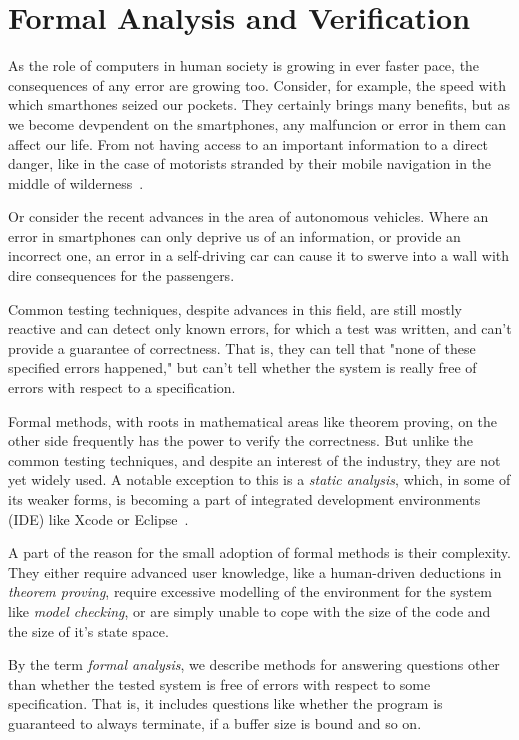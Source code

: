 
\chapter{Formal Analysis and Verification} \label{chap:fav}
As the role of computers in human society is growing in ever faster pace, the consequences of any error are growing too. Consider, for example, the speed with which smarthones seized our pockets. They certainly brings many benefits, but as we become devpendent on the smartphones, any malfuncion or error in them can affect our life. From not having access to an important information to a direct danger, like in the case of motorists stranded by their mobile navigation in the middle of wilderness~\cite{appleMaps}.

Or consider the recent advances in the area of autonomous vehicles. Where an error in smartphones can only deprive us of an information, or provide an incorrect one, an error in a self-driving car can cause it to swerve into a wall with dire consequences for the passengers.

Common testing techniques, despite advances in this field, are still mostly reactive and can detect only known errors, for which a test was written, and can't provide a guarantee of correctness. That is, they can tell that "none of these specified errors happened," but can't tell whether the system is really free of errors with respect to a specification.

Formal methods, with roots in mathematical areas like theorem proving, on the other side frequently has the power to verify the correctness. But unlike the common testing techniques, and despite an interest of the industry, they are not yet widely used. A notable exception to this is a {\em static analysis}, which, in some of its weaker forms, is becoming a part of integrated development environments (IDE) like Xcode or Eclipse~\cite{xcodeAnalysis}.

A part of the reason for the small adoption of formal methods is their complexity. They either require advanced user knowledge, like a human-driven deductions in {\em theorem proving}, require excessive modelling of the environment for the system like {\em model checking}, or are simply unable to cope with the size of the code and the size of it's state space.

By the term {\em formal analysis}, we describe methods for answering questions other than whether the tested system is free of errors with respect to some specification. That is, it includes questions like whether the program is guaranteed to always terminate, if a buffer size is bound and so on.

